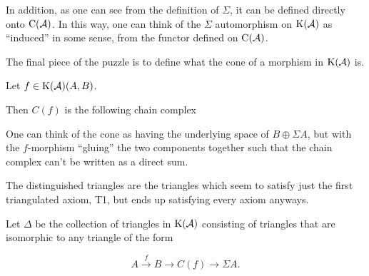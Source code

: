 In addition, as one can see from the definition of \( \Sigma \), it can be defined directly onto \( \operatorname{C}({\mathcal{A}}) \). In this way, one can think of the \( \Sigma \) automorphism on \( \K(\Ac) \) as ``induced'' in some sense, from the functor defined on \( \operatorname{C}({\mathcal{A}}) \).

The final piece of the puzzle is to define what the cone of a morphism in \( \K(\Ac) \) is.

\begin{definition}[Cone in \( \K(\Ac) \)]
    Let \( f \in \operatorname{K}({\mathcal{A}})(A, B) \).

    Then \( C(f) \) is the following chain complex
    \begin{center}
    \end{center}
\end{definition}

One can think of the cone as having the underlying space of \( B \oplus \Sigma A \), but with the \( f \)-morphism ``gluing'' the two components together such that the chain complex can't be written as a direct sum.

The distinguished triangles are the triangles which seem to satisfy just the first triangulated axiom, T1, but ends up satisfying every axiom anyways.

\begin{definition}
    \label{def:chain_homotopy_dist}
    Let \( \Delta \) be the collection of triangles in \( \K(\Ac) \) consisting of triangles that are isomorphic to any triangle of the form

    \[
        A \stackrel{f}{\to} B \to C(f) \to \Sigma A.
    \]
\end{definition}

